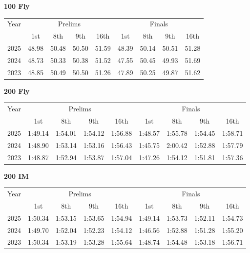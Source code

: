 \textbf{100 Fly}

\begin{flushleft}
\begin{tabular}{|c|c|c|c|c|c|c|c|c|}
\hline
Year & \multicolumn{4}{c|}{Prelims} & \multicolumn{4}{c|}{Finals} \\
\cline{2-9}
& 1st & 8th & 9th & 16th & 1st & 8th & 9th & 16th \\
\hline
2025 & 48.98 & 50.48 & 50.50 & 51.59 & 48.39 & 50.14 & 50.51 & 51.28 \\
2024 & 48.73 & 50.33 & 50.38 & 51.52 & 47.55 & 50.45 & 49.93 & 51.69 \\
2023 & 48.85 & 50.49 & 50.50 & 51.26 & 47.89 & 50.25 & 49.87 & 51.62 \\
\hline
\end{tabular}
\end{flushleft}

\textbf{200 Fly}

\begin{flushleft}
\begin{tabular}{|c|c|c|c|c|c|c|c|c|}
\hline
Year & \multicolumn{4}{c|}{Prelims} & \multicolumn{4}{c|}{Finals} \\
\cline{2-9}
& 1st & 8th & 9th & 16th & 1st & 8th & 9th & 16th \\
\hline
2025 & 1:49.14 & 1:54.01 & 1:54.12 & 1:56.88 & 1:48.57 & 1:55.78 & 1:54.45 & 1:58.71 \\
2024 & 1:48.90 & 1:53.14 & 1:53.16 & 1:56.43 & 1:45.75 & 2:00.42 & 1:52.88  & 1:57.79  \\
2023 & 1:48.87 & 1:52.94 & 1:53.87 & 1:57.04 & 1:47.26 & 1:54.12 & 1:51.81 & 1:57.36 \\
\hline
\end{tabular}
\end{flushleft}

\textbf{200 IM}

\begin{flushleft}
\begin{tabular}{|c|c|c|c|c|c|c|c|c|}
\hline
Year & \multicolumn{4}{c|}{Prelims} & \multicolumn{4}{c|}{Finals} \\
\cline{2-9}
& 1st & 8th & 9th & 16th & 1st & 8th & 9th & 16th \\
\hline
2025 & 1:50.34 & 1:53.15 & 1:53.65 & 1:54.94 & 1:49.14 & 1:53.73 & 1:52.11 & 1:54.73 \\
2024 & 1:49.70 & 1:52.04 & 1:52.23 & 1:54.12 & 1:46.56 & 1:52.88 & 1:51.28 & 1:55.20 \\
2023 & 1:50.34 & 1:53.19 & 1:53.28 & 1:55.64 & 1:48.74 & 1:54.48 & 1:53.18 & 1:56.71 \\
\hline
\end{tabular}
\end{flushleft}

